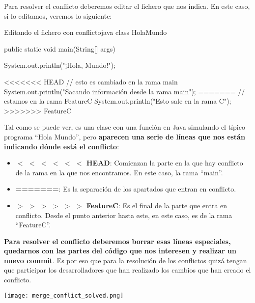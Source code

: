 

Para resolver el conflicto deberemos editar el fichero que nos indica. En este caso, si lo editamos, veremos lo siguiente:


\begin{mycode}{Editando el fichero con conflicto}{java}{}
class HolaMundo {
    public static void main(String[] args) {
        System.out.println("¡Hola, Mundo!");

        <<<<<<< HEAD
        // esto es cambiado en la rama main
        System.out.println("Sacando información desde la rama main");
        =======
        // estamos en la rama FeatureC
        System.out.println("Esto sale en la rama C");
        >>>>>>> FeatureC
    }
}
\end{mycode}

Tal como se puede ver, es una clase con una función en Java simulando el típico programa “Hola Mundo”, pero \textbf{aparecen una serie de líneas que nos están indicando dónde está el conflicto}:

\begin{itemize}
    \item \textbf{$<$ $<$ $<$ $<$ $<$ $<$ HEAD}: Comienzan la parte en la que hay conflicto de la rama en la que nos encontramos. En este caso, la rama “main”.

    \item \textbf{=======}: Es la separación de los apartados que entran en conflicto.

    \item \textbf{$>$ $>$ $>$ $>$ $>$ $>$ FeatureC}: Es el final de la parte que entra en conflicto. Desde el punto anterior hasta este, en este caso, es de la rama “FeatureC”.
\end{itemize}

\textbf{Para resolver el conflicto deberemos borrar esas líneas especiales, quedarnos con las partes del código que nos interesen y realizar un nuevo commit}. Es por eso que para la resolución de los conflictos quizá tengan que participar los desarrolladores que han realizado los cambios que han creado el conflicto.


\begin{center}
    \texttt{[image: merge\_conflict\_solved.png]}
\end{center}
